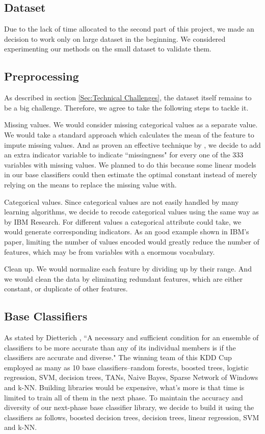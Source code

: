\documentclass[journal]{IEEEtran}
\begin{document}
\subsection{Dataset}
Due to the lack of time allocated to the second part of this project, we made an decision to work only on large dataset in the beginning. We considered experimenting our methods on the small dataset to validate them.
\subsection{Preprocessing}
As described in section \ref{Sec:Technical Challenges}, the dataset itself remains to be a big challenge. Therefore, we agree to take the following steps to tackle it.
\par
Missing values. We would consider missing categorical values as a separate value. We would take a standard approach which calculates the mean of the feature to impute missing values. And as proven an effective technique by \cite{Ref:WinningtheKDDCupIBMResearch}, we decide to add an extra indicator variable to indicate ``missingness" for every one of the 333 variables with missing values. We planned to do this because some linear models in our base classifiers could then estimate the optimal constant instead of merely relying on the means to replace the missing value with.
\par
Categorical values. Since categorical values are not easily handled by many learning algorithms, we decide to recode categorical values using the same way as by IBM Research. For different values a categorical attribute could take, we would generate corresponding indicators. As an good example shown in IBM's paper, limiting the number of values encoded would greatly reduce the number of features, which may be from variables with a enormous vocabulary.
\par
Clean up. We would normalize each feature by dividing up by their range. And we would clean the data by eliminating redundant features, which are either constant, or duplicate of other features.

\subsection{Base Classifiers}
As stated by Dietterich \cite{Ref:EnsembleMethodsInMachineLearning}, ``A necessary and sufficient condition for an ensemble of classifiers to be more accurate than any of its individual members is if the classifiers are accurate and diverse." The winning team of this KDD Cup employed as many as 10 base classifiers--random forests, boosted trees, logistic regression, SVM, decision trees, TANs, Naive Bayes, Sparse Network of Windows and k-NN. Building libraries would be expensive, what's more is that time is limited to train all of them in the next phase. To maintain the accuracy and diversity of our next-phase base classifier library, we decide to build it using the classifiers as follows, boosted decision trees, decision trees, linear regression, SVM and k-NN.
\end{document}
